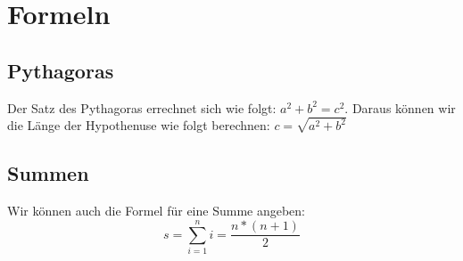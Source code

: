 \documentclass[12pt,a4paper]{article}
\begin{document}
\section{Formeln}
\subsection{Pythagoras}
Der Satz des Pythagoras errechnet sich wie folgt: $ a^2+b^2=c^2 $. Daraus k\"onnen
wir die L\"ange der Hypothenuse wie folgt berechnen: $ c=\sqrt{a^2+b^2} $
\subsection{Summen}
Wir k\"onnen auch die Formel f\"ur eine Summe angeben:
\begin{equation}
s=\sum\limits_{i=1}^{n}i=\frac{n*(n + 1)}{2}
\end{equation}
\end{document}
